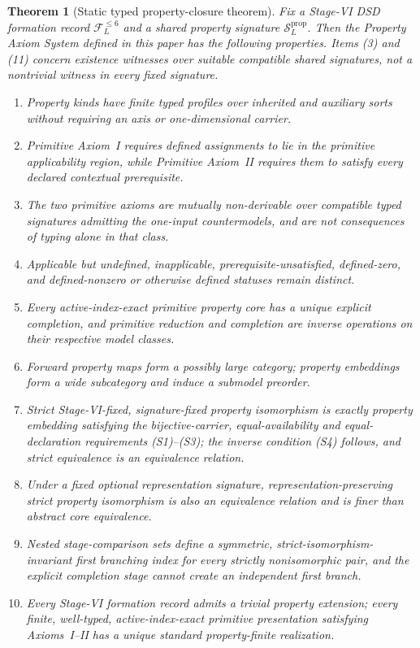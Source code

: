 \documentclass[11pt]{article}
\newcommand{\FVI}{\mathcal F_{L}^{\le 6}}
\newcommand{\Sprop}{\mathcal S_{L}^{\mathrm{prop}}}
\newtheorem{theorem}{Theorem}[section]
\theoremstyle{definition}
\theoremstyle{remark}
\begin{document}
\begin{theorem}[Static typed property-closure theorem]
\label{thm:main}
Fix a Stage-VI DSD formation record \(\FVI\) and a shared property signature \(\Sprop\).
Then the Property Axiom System defined in this paper has the following properties.
Items (3) and (11) concern existence witnesses over suitable compatible
shared signatures, not a nontrivial witness in every fixed signature.
\begin{enumerate}[label=(\arabic*)]
\item Property kinds have finite typed profiles over inherited and auxiliary sorts without requiring an axis or one-dimensional carrier.
\item Primitive Axiom~I requires defined assignments to lie in the primitive applicability region, while Primitive Axiom~II requires them to satisfy every declared contextual prerequisite.
\item The two primitive axioms are mutually non-derivable over compatible typed signatures admitting the one-input countermodels, and are not consequences of typing alone in that class.
\item Applicable but undefined, inapplicable, prerequisite-unsatisfied, defined-zero, and defined-nonzero or otherwise defined statuses remain distinct.
\item Every active-index-exact primitive property core has a unique explicit completion, and primitive reduction and completion are inverse operations on their respective model classes.
\item Forward property maps form a possibly large category; property embeddings form a wide subcategory and induce a submodel preorder.
\item Strict Stage-VI-fixed, signature-fixed property isomorphism is exactly property embedding satisfying the bijective-carrier, equal-availability and equal-declaration requirements (S1)--(S3); the inverse condition (S4) follows, and strict equivalence is an equivalence relation.
\item Under a fixed optional representation signature, representation-preserving strict property isomorphism is also an equivalence relation and is finer than abstract core equivalence.
\item Nested stage-comparison sets define a symmetric, strict-isomorphism-invariant first branching index for every strictly nonisomorphic pair, and the explicit completion stage cannot create an independent first branch.
\item Every Stage-VI formation record admits a trivial property extension; every finite, well-typed, active-index-exact primitive presentation satisfying Axioms~I--II has a unique standard property-finite realization.

\end{enumerate}
\end{theorem}
\end{document}

